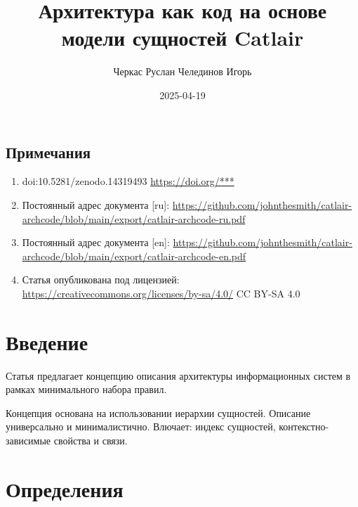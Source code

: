 \documentclass[final]{article}
\begin{document}
    \title{Архитектура как код на основе модели сущностей Catlair}
    \author{
        Черкас Руслан
        Челединов Игорь
    }
    \date{2025-04-19}

    \begin{small}
        \begingroup
        \renewcommand{\baselinestretch}{0.8}

        \renewcommand{\contentsname}{Содержание}
        \maketitle
        \tableofcontents

        \section*{Примечания}
            \begin{enumerate}
                \item doi:10.5281/zenodo.14319493
                \url{https://doi.org/***}

                \item Постоянный адрес документа [ru]: 
                \url{https://github.com/johnthesmith/catlair-archcode/blob/main/export/catlair-archcode-ru.pdf}

                \item Постоянный адрес документа [en]: 
                \url{https://github.com/johnthesmith/catlair-archcode/blob/main/export/catlair-archcode-en.pdf}

                \item Статья опубликована под лицензией: 
                \url{https://creativecommons.org/licenses/by-sa/4.0/} CC BY-SA 4.0
            \end{enumerate}
        \endgroup
    \end{small}

    \section{Введение}

        Статья предлагает концепцию описания архитектуры информационных систем в 
        рамках минимального набора правил.

        Концепция основана на использовании иерархии сущностей. Описание 
        универсально и минималистично. Влючает: индекс сущностей, 
        контекстно-зависимые свойства и связи.

    \section{Определения} 
\end{document}
